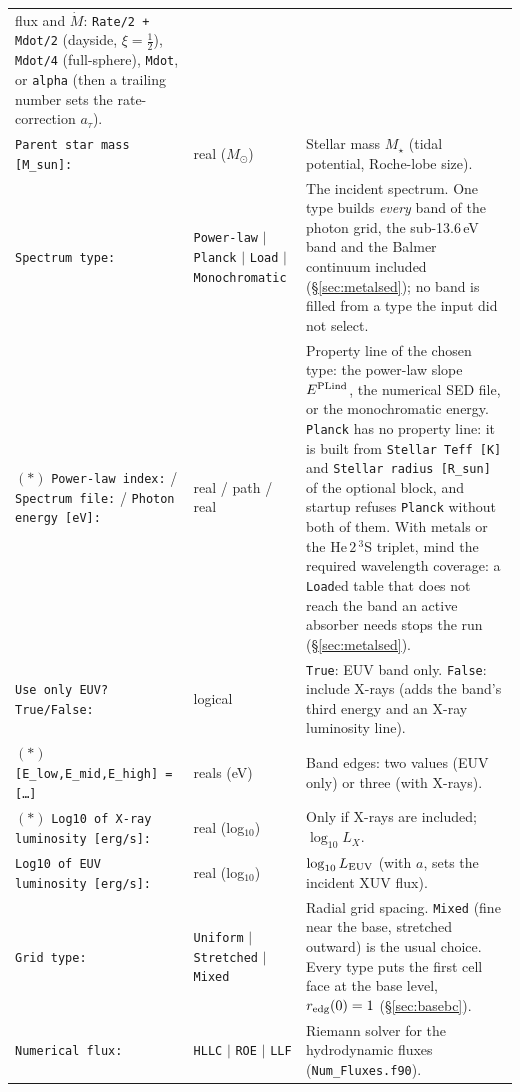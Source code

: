 \documentclass[english,a4paper]{my_memo}
\newcommand{\msun}{$M_\odot$}
\begin{document}
\begin{longtable}{@{}p{}p{}p{}@{}}
  flux and $\dot M$: \texttt{Rate/2 + Mdot/2} (dayside, $\xi=\tfrac12$),
  \texttt{Mdot/4} (full-sphere), \texttt{Mdot}, or \texttt{alpha} (then a
  trailing number sets the rate-correction $a_\tau$). \\
\texttt{Parent star mass [M\_sun]:} & real (\msun) & Stellar mass $M_\star$
  (tidal potential, Roche-lobe size). \\
\texttt{Spectrum type:} & \texttt{Power-law} $|$ \texttt{Planck} $|$
  \texttt{Load} $|$ \texttt{Monochromatic} & The incident spectrum. One type
  builds \emph{every} band of the photon grid, the sub-13.6\,eV band and the
  Balmer continuum included (\S\ref{sec:metalsed}); no band is filled from a
  type the input did not select. \\
$(\ast)$ \texttt{Power-law index:} / \texttt{Spectrum file:} /
  \texttt{Photon energy [eV]:} & real / path / real & Property line of the
  chosen type: the power-law slope $E^{\rm PLind}$, the numerical SED file, or
  the monochromatic energy. \texttt{Planck} has no property line: it is built
  from \texttt{Stellar Teff [K]} and \texttt{Stellar radius [R\_sun]} of the
  optional block, and startup refuses \texttt{Planck} without both of them.
  With metals or the He\,$2\,^3$S triplet, mind the required wavelength
  coverage: a \texttt{Load}ed table that does not reach the band an active
  absorber needs stops the run (\S\ref{sec:metalsed}). \\
\texttt{Use only EUV? True/False:} & logical & \texttt{True}: EUV band only.
  \texttt{False}: include X-rays (adds the band's third energy and an X-ray
  luminosity line). \\
$(\ast)$ \texttt{[E\_low,E\_mid,E\_high] = [\ldots]} & reals (eV) & Band edges:
  two values (EUV only) or three (with X-rays). \\
$(\ast)$ \texttt{Log10 of X-ray luminosity [erg/s]:} & real (log$_{10}$) & Only
  if X-rays are included; $\log_{10}L_X$. \\
\texttt{Log10 of EUV luminosity [erg/s]:} & real (log$_{10}$) & $\log_{10}L_{\rm
  EUV}$ (with $a$, sets the incident XUV flux). \\
\texttt{Grid type:} & \texttt{Uniform} $|$ \texttt{Stretched} $|$ \texttt{Mixed}
  & Radial grid spacing. \texttt{Mixed} (fine near the base, stretched outward)
  is the usual choice. Every type puts the first cell face at the base level,
  $r_{\rm edg}(0)=1$ (\S\ref{sec:basebc}). \\
\texttt{Numerical flux:} & \texttt{HLLC} $|$ \texttt{ROE} $|$ \texttt{LLF} &
  Riemann solver for the hydrodynamic fluxes (\texttt{Num\_Fluxes.f90}).

\end{longtable}
\end{document}

